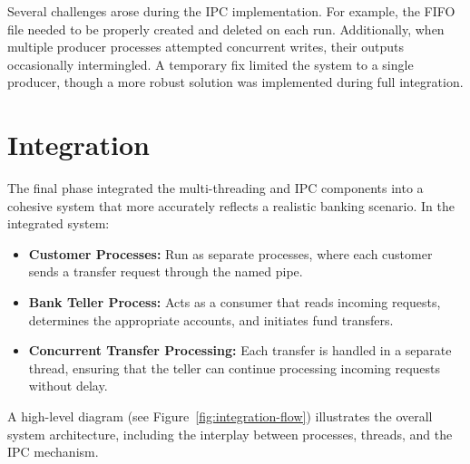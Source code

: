 \documentclass[conference]{report}
\begin{document}
Several challenges arose during the IPC implementation. For example, the FIFO file needed to be properly created and deleted on each run. Additionally, when multiple producer processes attempted concurrent writes, their outputs occasionally intermingled. A temporary fix limited the system to a single producer, though a more robust solution was implemented during full integration.

\section*{Integration}
The final phase integrated the multi-threading and IPC components into a cohesive system that more accurately reflects a realistic banking scenario. In the integrated system:
\begin{itemize}
    \item \textbf{Customer Processes:} Run as separate processes, where each customer sends a transfer request through the named pipe.
    \item \textbf{Bank Teller Process:} Acts as a consumer that reads incoming requests, determines the appropriate accounts, and initiates fund transfers.
    \item \textbf{Concurrent Transfer Processing:} Each transfer is handled in a separate thread, ensuring that the teller can continue processing incoming requests without delay.
\end{itemize}

A high-level diagram (see Figure~\ref{fig:integration-flow}) illustrates the overall system architecture, including the interplay between processes, threads, and the IPC mechanism.

\hfill
\end{document}
